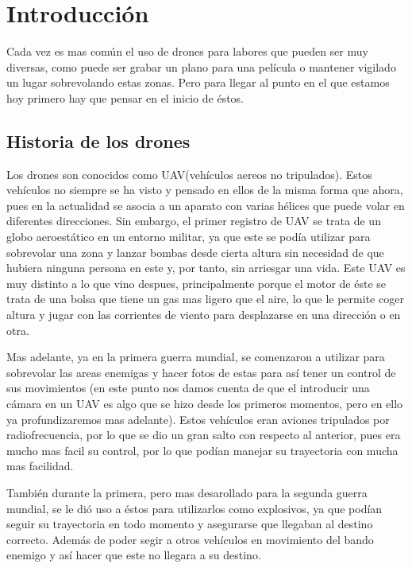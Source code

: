 

\chapter{Introducci\'on}\label{cap.introduccion}
Cada vez es mas com\'un el uso de drones para labores que pueden ser muy diversas, como puede ser grabar un plano para una pel\'icula o mantener vigilado un lugar sobrevolando estas zonas. Pero para llegar al punto en el que estamos hoy primero hay que pensar en el inicio de \'estos. 

\section{Historia de los drones}
\hspace{1 cm} Los drones son conocidos como UAV(veh\'iculos aereos no tripulados). Estos veh\'iculos no siempre se ha visto y pensado en ellos de la misma forma que ahora, pues en la actualidad se asocia a un aparato con varias h\'elices que puede volar en diferentes direcciones. Sin embargo, el primer registro de UAV se trata de un globo aeroest\'atico en un entorno militar, ya que este se pod\'ia utilizar para sobrevolar una zona y lanzar bombas desde cierta altura sin necesidad de que hubiera ninguna persona en este y, por tanto, sin arriesgar una vida. Este UAV es muy distinto a lo que vino despues, principalmente porque el motor de \'este se trata de una bolsa que tiene un gas mas ligero que el aire, lo que le permite coger altura y jugar con las corrientes de viento para desplazarse en una direcci\'on o en otra. 

\hspace{1 cm} Mas adelante, ya en la primera guerra mundial, se comenzaron a utilizar para sobrevolar las areas enemigas y hacer fotos de estas para as\'i tener un control de sus movimientos (en este punto nos damos cuenta de que el introducir una c\'amara en un UAV es algo que se hizo desde los primeros momentos, pero en ello ya profundizaremos mas adelante). Estos veh\'iculos eran aviones tripulados por radiofrecuencia, por lo que se dio un gran salto con respecto al anterior, pues era mucho mas facil su control, por lo que pod\'ian manejar su trayectoria con mucha mas facilidad. 

\hspace{1 cm} Tambi\'en durante la primera, pero mas desarollado para la segunda guerra mundial, se le di\'o uso a \'estos para utilizarlos como explosivos, ya que pod\'ian seguir su trayectoria en todo momento y asegurarse que llegaban al destino correcto. Adem\'as de poder segir a otros veh\'iculos en movimiento del bando enemigo y as\'i hacer que este no llegara a su destino. 

